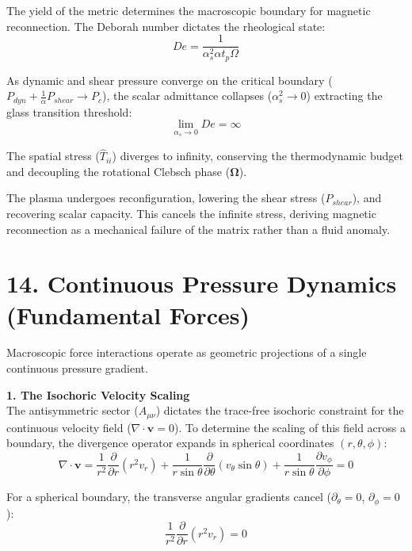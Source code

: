 The yield of the metric determines the macroscopic boundary for magnetic reconnection. The Deborah number dictates the rheological state: 
\begin{equation}
    De = \frac{1}{\alpha_s^2 \alpha t_p \Omega}
\end{equation}

As dynamic and shear pressure converge on the critical boundary ($P_{dyn} + \frac{1}{\alpha}P_{shear} \to P_c$), the scalar admittance collapses ($\alpha_s^2 \to 0$) extracting the glass transition threshold: %
\begin{equation}
    \lim_{\alpha_s \to 0} De = \infty
\end{equation}

The spatial stress ($\hat{T}_{ii}$) diverges to infinity, conserving the thermodynamic budget and decoupling the rotational Clebsch phase ($\boldsymbol{\Omega}$). 

The plasma undergoes reconfiguration, lowering the shear stress ($P_{shear}$), and recovering scalar capacity. This cancels the infinite stress, deriving magnetic reconnection as a mechanical failure of the matrix rather than a fluid anomaly.


\section*{14. Continuous Pressure Dynamics (Fundamental Forces)}

Macroscopic force interactions operate as geometric projections of a single continuous pressure gradient. 

\textbf{1. The Isochoric Velocity Scaling} \\
The antisymmetric sector ($A_{\mu\nu}$) dictates the trace-free isochoric constraint for the continuous velocity field ($\nabla \cdot \mathbf{v} = 0$). To determine the scaling of this field across a boundary, the divergence operator expands in spherical coordinates $(r, \theta, \phi)$:
\begin{equation}
    \nabla \cdot \mathbf{v} = \frac{1}{r^2} \frac{\partial}{\partial r}(r^2 v_r) + \frac{1}{r \sin\theta} \frac{\partial}{\partial \theta}(v_\theta \sin\theta) + \frac{1}{r \sin\theta} \frac{\partial v_\phi}{\partial \phi} = 0
\end{equation}

For a spherical boundary, the transverse angular gradients cancel ($\partial_\theta = 0$, $\partial_\phi = 0$): 
\begin{equation}
    \frac{1}{r^2} \frac{\partial}{\partial r}(r^2 v_r) = 0
\end{equation}

